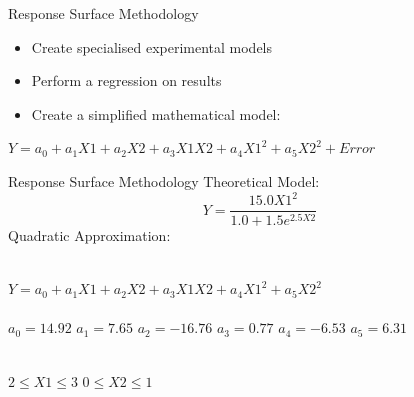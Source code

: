 \documentclass[14pt]{beamer}
\begin{document}
\begin{frame}{Response Surface Methodology}
\pause
\begin{itemize}
\item Create specialised experimental models
\pause
\item Perform a regression on results
\pause
\item Create a simplified mathematical model:
\end{itemize}
\pause
\begin{center}
{\small $Y = a_0+a_1X1 + a_2X2 + a_3X1X2 + a_4X1^2+a_5X2^2 + Error$}
\end{center}
\end{frame}

\begin{frame}{Response Surface Methodology}
Theoretical Model:
{\small $$ Y=\frac{15.0X1^2}{1.0+1.5e^{2.5X2}} $$}
\pause
Quadratic Approximation: \\
\ \\
{\small $Y = a_0+a_1X1 + a_2X2 + a_3X1X2 + a_4X1^2+a_5X2^2$ \\
\ \\
\pause
$a_0 = 14.92$ \hspace{1cm} $a_1 = 7.65$ \hspace{1cm} $a_2 = -16.76$ \hspace{1cm} $a_3 = 0.77$ \hspace{1.197cm} $a_4 = -6.53$ \hspace{0.665cm} $a_5 = 6.31$\\
\ \\
\begin{center}$2 \leq X1 \leq 3$ \hspace{2cm} $0\leq X2\leq1$\end{center}}
\end{frame}
\end{document}
